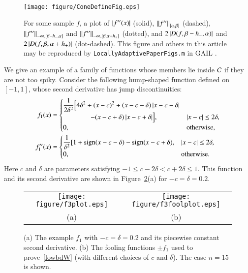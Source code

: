 \documentclass[review]{elsarticle}
\theoremstyle{definition}
\begin{document}
\begin{figure}
	\centering
	\texttt{[image: figure/ConeDefineFig.eps]}
	\caption{For some sample $f$, a plot of $\abs{f''(x)}$ (solid), 
	$\norm[{[\alpha,\beta]}]{f''}$ (dashed), 
   $\norm[-\infty,{[\beta - h_-,\alpha]}]{f''}$ and $\norm[-\infty,{[\beta,
    \alpha+h_+]}]{f''}$ (dotted), and 
    $2\abs{D(f,\beta - h_-,\alpha)}$ and $2\abs{D(f,\beta,\alpha+h_+)}$ (dot-dashed).  
    This figure and others in this article may be reproduced by 
    \texttt{LocallyAdaptivePaperFigs.m} in GAIL \cite{ChoEtal15a}.
    \label{fig:ConeDef}}
\end{figure}

We give an example of a family of functions whose members lie
inside $\cc$ if they are not too spiky.
Consider the following hump-shaped function defined on $[-1,1]$, whose
second derivative has jump discontinuities:
\begin{align} \label{f3def}
f_1(x) & = \begin{cases} \displaystyle
   \frac{1}{2\delta^2} \Bigl [4 \delta^2 + (x-c)^2 + (x-c-\delta)\abs{x-c-\delta}
\\ \qquad \qquad
    - (x-c+\delta)\abs{x-c+\delta} \Bigr ], & \abs{x-c} \le 2\delta,
\\ 0, & \text{otherwise},
\end{cases}
\\ \nonumber
f''_1(x) & =
\begin{cases} \displaystyle
    \frac{1}{\delta^2} [1 + \sign(x-c-\delta) - \sign(x-c+\delta), & \abs{x-c} \le 2\delta,
\\ 0, & \text{otherwise}.
\end{cases}
\end{align}
Here $c$ and $\delta$ are parameters satisfying $-1 \le c-2 \delta < c+ 2\delta
\le 1$. This function and its second derivative are shown in Figure~\ref{f3fig}(a)
for $-c=\delta = 0.2$.


\begin{figure}[tb]
\centering
\begin{tabular}{cc}
\texttt{[image: figure/f3plot.eps]}
& \texttt{[image: figure/f3foolplot.eps]}
\\[1ex] (a) & (b)
\end{tabular}
\caption{(a) The example $f_1$ with $-c=\delta = 0.2$ and its piecewise constant
second derivative.
(b) The fooling functions $\pm f_1$ used to prove~\eqref{lowbdW} (with different choices 
of $c$ and $\delta$). The case
$n=15$ is shown. \label{f3fig}}
\end{figure}
\end{document}
